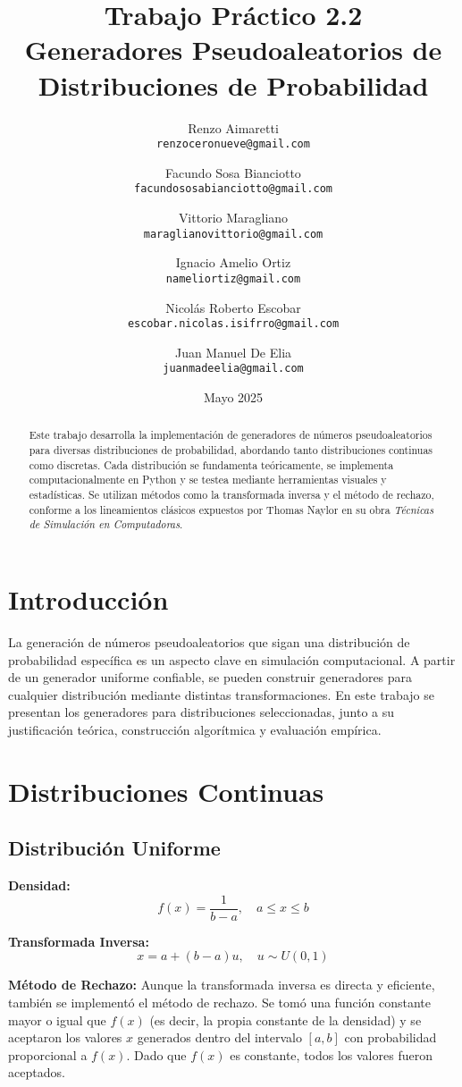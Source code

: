 \documentclass{article}
\title{Trabajo Práctico 2.2 \\
Generadores Pseudoaleatorios de Distribuciones de Probabilidad}
\author{
    Renzo Aimaretti \\ \texttt{renzoceronueve@gmail.com}
    \and
    Facundo Sosa Bianciotto \\ \texttt{facundososabianciotto@gmail.com}
    \and
    Vittorio Maragliano \\ \texttt{maraglianovittorio@gmail.com}
    \and
    Ignacio Amelio Ortiz \\ \texttt{nameliortiz@gmail.com}
    \and
    Nicolás Roberto Escobar \\ \texttt{escobar.nicolas.isifrro@gmail.com}
    \and
    Juan Manuel De Elia \\ \texttt{juanmadeelia@gmail.com}
}
\date{Mayo 2025}
\begin{document}
\maketitle

\begin{abstract}
Este trabajo desarrolla la implementación de generadores de números pseudoaleatorios para diversas distribuciones de probabilidad, abordando tanto distribuciones continuas como discretas. Cada distribución se fundamenta teóricamente, se implementa computacionalmente en Python y se testea mediante herramientas visuales y estadísticas. Se utilizan métodos como la transformada inversa y el método de rechazo, conforme a los lineamientos clásicos expuestos por Thomas Naylor en su obra \textit{Técnicas de Simulación en Computadoras}.
\end{abstract}

\section{Introducción}
La generación de números pseudoaleatorios que sigan una distribución de probabilidad específica es un aspecto clave en simulación computacional. A partir de un generador uniforme confiable, se pueden construir generadores para cualquier distribución mediante distintas transformaciones. En este trabajo se presentan los generadores para distribuciones seleccionadas, junto a su justificación teórica, construcción algorítmica y evaluación empírica.

\section{Distribuciones Continuas}

\subsection{Distribución Uniforme}
\textbf{Densidad:}
\begin{equation}
f(x) = \frac{1}{b-a}, \quad a \leq x \leq b
\end{equation}

\textbf{Transformada Inversa:}
\begin{equation}
x = a + (b-a)u, \quad u \sim U(0,1)
\end{equation}

\textbf{Método de Rechazo:} Aunque la transformada inversa es directa y eficiente, también se implementó el método de rechazo. Se tomó una función constante mayor o igual que $f(x)$ (es decir, la propia constante de la densidad) y se aceptaron los valores $x$ generados dentro del intervalo $[a,b]$ con probabilidad proporcional a $f(x)$. Dado que $f(x)$ es constante, todos los valores fueron aceptados.
\end{document}
